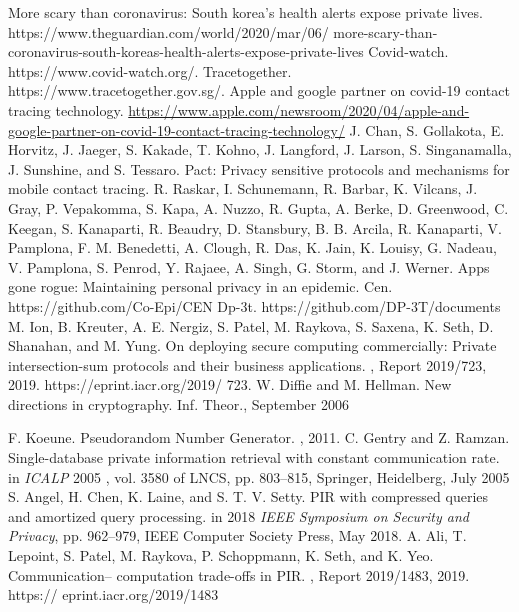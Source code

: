 \documentclass[11pt]{article} %
\begin{document}
\begin{thebibliography}{10}
\begin{small}
 More scary than coronavirus: South korea’s health alerts expose private lives. \newblock https://www.theguardian.com/world/2020/mar/06/
more-scary-than-coronavirus-south-koreas-health-alerts-expose-private-lives
 Covid-watch. \newblock  https://www.covid-watch.org/.
 Tracetogether. \newblock  https://www.tracetogether.gov.sg/.
 Apple and google partner on covid-19 contact tracing technology. \newblock  \url{https://www.apple.com/newsroom/2020/04/apple-and-google-partner-on-covid-19-contact-tracing-technology/}
 J. Chan, S. Gollakota, E. Horvitz, J. Jaeger, S. Kakade, T. Kohno, J. Langford, J. Larson, S. Singanamalla,
J. Sunshine, and S. Tessaro. \newblock Pact: Privacy sensitive protocols and mechanisms for mobile contact tracing. 
  R. Raskar, I. Schunemann, R. Barbar, K. Vilcans, J. Gray, P. Vepakomma, S. Kapa, A. Nuzzo, R. Gupta,
A. Berke, D. Greenwood, C. Keegan, S. Kanaparti, R. Beaudry, D. Stansbury, B. B. Arcila, R. Kanaparti,
V. Pamplona, F. M. Benedetti, A. Clough, R. Das, K. Jain, K. Louisy, G. Nadeau, V. Pamplona, S. Penrod,
Y. Rajaee, A. Singh, G. Storm, and J. Werner. \newblock Apps gone rogue: Maintaining personal privacy in an
epidemic. 
 Cen. \newblock https://github.com/Co-Epi/CEN
 Dp-3t. \newblock https://github.com/DP-3T/documents
 M. Ion, B. Kreuter, A. E. Nergiz, S. Patel, M. Raykova, S. Saxena, K. Seth, D. Shanahan, and M. Yung. \newblock On
deploying secure computing commercially: Private intersection-sum protocols and their business applications. , Report 2019/723, 2019. https://eprint.iacr.org/2019/
723.
 W. Diffie and M. Hellman.  \newblock New directions in cryptography.    Inf. Theor., September 2006

 F. Koeune. \newblock Pseudorandom Number Generator. , 2011.
  C. Gentry and Z. Ramzan. \newblock Single-database private information retrieval with constant communication
rate. \newblock in {\em ICALP} 2005 , vol. 3580
of LNCS, pp. 803–815, Springer, Heidelberg, July 2005
  S. Angel, H. Chen, K. Laine, and S. T. V. Setty. \newblock PIR with compressed queries and amortized query
processing. \newblock in 2018 {\em IEEE Symposium on Security and Privacy}, pp. 962–979, IEEE Computer Society
Press, May 2018.
 A. Ali, T. Lepoint, S. Patel, M. Raykova, P. Schoppmann, K. Seth, and K. Yeo. \newblock Communication–
computation trade-offs in PIR. , Report 2019/1483, 2019. https://
eprint.iacr.org/2019/1483


\end{small}
\end{thebibliography}
\end{document}
